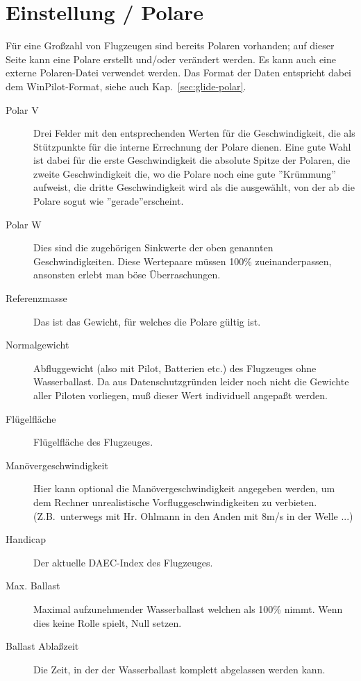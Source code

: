 \section{Einstellung / Polare}

Für eine Großzahl von Flugzeugen sind bereits Polaren vorhanden; auf dieser Seite kann eine
Polare erstellt und/oder verändert werden. Es kann auch eine externe Polaren-Datei verwendet werden.
Das Format der Daten entspricht dabei dem WinPilot-Format, siehe auch Kap.~\ref{sec:glide-polar}.
\label{conf:polar}

\begin{description}
\item[Polar V] Drei Felder mit den entsprechenden Werten für die Geschwindigkeit, die als Stützpunkte für die interne Errechnung der Polare dienen.
Eine gute Wahl ist dabei für die erste Geschwindigkeit die absolute Spitze der Polaren, die zweite Geschwindigkeit die, wo die Polare noch eine gute ''Krümmung'' aufweist, die dritte Geschwindigkeit wird als die ausgewählt, von der ab die Polare sogut wie ''gerade''erscheint.
\item[Polar W] Dies sind die zugehörigen Sinkwerte der oben genannten Geschwindigkeiten. Diese Wertepaare  müssen 100\% zueinanderpassen, ansonsten erlebt man böse Überraschungen.
\item[Referenzmasse] Das ist das Gewicht, für welches die Polare gültig ist.
\item[Normalgewicht] Abfluggewicht (also mit Pilot, Batterien etc.) des Flugzeuges ohne Wasserballast.
Da \xc aus Datenschutzgründen leider noch nicht die Gewichte aller Piloten vorliegen, muß dieser Wert individuell angepaßt werden.
\item[Flügelfläche]  Flügelfläche des Flugzeuges.
\item[Manövergeschwindigkeit] Hier kann optional die Manövergeschwindigkeit angegeben werden, um dem Rechner unrealistische Vorfluggeschwindigkeiten zu verbieten.
(Z.B.\ unterwegs mit Hr. Ohlmann in den Anden mit 8m/s in der Welle ...)
\item[Handicap]  Der aktuelle DAEC-Index des Flugzeuges.
\item[Max. Ballast] Maximal aufzunehmender Wasserballast welchen \xc als 100\% nimmt.
Wenn dies keine Rolle spielt,  Null setzen.
\item[Ballast Ablaßzeit]  Die Zeit, in der der Wasserballast komplett abgelassen werden kann.
\end{description}
